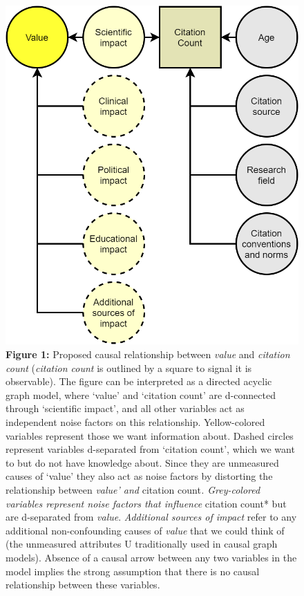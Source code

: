 \documentclass[
  english,
  jou,floatsintext]{apa6}
\begin{document}
\begin{figure}
\centering
\includegraphics{figure_1.png}
\caption{\textbf{Figure 1:} Proposed causal relationship between \emph{value} and \emph{citation count} (\emph{citation count} is outlined by a square to signal it is observable). The figure can be interpreted as a directed acyclic graph model, where `value' and `citation count' are d-connected through `scientific impact', and all other variables act as independent noise factors on this relationship. Yellow-colored variables represent those we want information about. Dashed circles represent variables d-separated from `citation count', which we want to but do not have knowledge about. Since they are unmeasured causes of `value' they also act as noise factors by distorting the relationship between \emph{value' and }citation count\emph{. Grey-colored variables represent noise factors that influence }citation count* but are d-separated from \emph{value}. \emph{Additional sources of impact} refer to any additional non-confounding causes of \emph{value} that we could think of (the unmeasured attributes U traditionally used in causal graph models). Absence of a causal arrow between any two variables in the model implies the strong assumption that there is no causal relationship between these variables. \label{fig:1}}
\end{figure}
\end{document}

